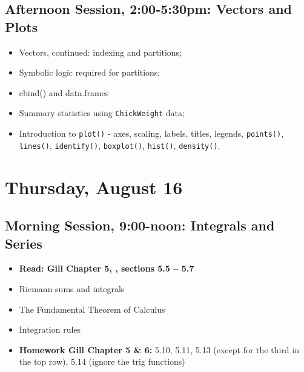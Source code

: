 \documentclass[12pt,a4paper]{article}
\begin{document}
\subsection*{Afternoon Session, 2:00-5:30pm: Vectors and Plots}
\begin{itemize}
\setlength{\itemsep}{0pt}
\footnotesize
\item Vectors, continued: indexing and partitions;
\item Symbolic logic required for partitions;
\item cbind() and data.frames
\item Summary statistics using \texttt{ChickWeight} data;
\item Introduction to \texttt{plot()} - axes, scaling, labels, titles, legends, \texttt{points()}, \texttt{lines()}, \texttt{identify()}, \texttt{boxplot()}, \texttt{hist()}, \texttt{density()}.
\end{itemize}


\section*{Thursday, August 16}

\subsection*{Morning Session, 9:00-noon: Integrals and Series}
\begin{itemize}
\setlength{\itemsep}{0pt}
\footnotesize
\item \textbf{Read: Gill Chapter 5, , sections 5.5 -- 5.7}
\item Riemann sums and integrals
\item The Fundamental Theorem of Calculus
\item Integration rules
\item \textbf{Homework Gill Chapter 5 \& 6:} 5.10, 5.11, 5.13 (except for the third in the top
row), 5.14 (ignore the trig functions)

\end{itemize}
\end{document}
